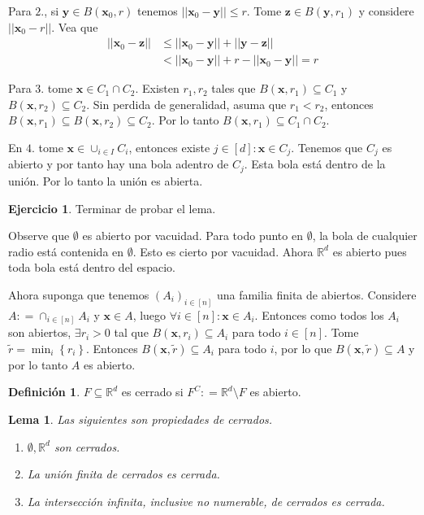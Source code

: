 \documentclass[12pt]{article}
\theoremstyle{plain}
\newtheorem{Lem}[Th]{Lema}             %
\theoremstyle{definition}
\newtheorem{Def}[Th]{Definición}       %
\newtheorem{Ej}[Th]{Ejercicio}
\theoremstyle{remark}
\numberwithin{equation}{section}
\newcommand{\bR}{\mathbb{R}}        %
\renewcommand{\leq}{\leqslant}      %
\renewcommand{\:}{\colon}           %
\renewcommand{\vec}[1]{\mathbf{#1}}
\newcommand{\vx}{\vec{x}}           %
\newcommand{\vy}{\vec{y}}
\newcommand{\vz}{\vec{z}}
\newcommand{\conj}[1]{\left\lbrace#1\right\rbrace}
\newcommand{\bonj}[1]{\left\lbrack#1\right\rbrack}
\begin{document}
\begin{multicols}{2}
\begin{ptcbp}
Para $\mathit{2}.$, si $\vy\in B(\vx_0,r)$ tenemos $||\vx_0-\vy||\leq r$. Tome $\vz\in B(\vy,r_1)$ y considere $||\vx_0-r||$. Vea que
\begin{align*}
  ||\vx_0-\vz|| &\leq ||\vx_0-\vy||+||\vy-\vz|| \\
  &<||\vx_0-\vy||+r-||\vx_0-\vy|| = r
\end{align*}



Para $\mathit{3}.$ tome $\vx\in C_1\cap C_2$. Existen $r_1,r_2$ tales que $B(\vx,r_1)\subseteq C_1$ y $B(\vx,r_2)\subseteq C_2$. Sin perdida de generalidad, asuma que $r_1<r_2$, entonces $B(\vx,r_1)\subseteq B(\vx,r_2)\subseteq C_2$. Por lo tanto $B(\vx,r_1)\subseteq C_1\cap C_2$.\par
En $\mathit{4}.$ tome $\vx\in\cup_{i\in I} C_i$, entonces existe $j\in\bonj{d}: \vx\in C_j$. Tenemos que $C_j$ es abierto y por tanto hay una bola adentro de $C_j$. Esta bola está dentro de la unión. Por lo tanto la unión es abierta.
\end{ptcbp}

\begin{Ej}
  Terminar de probar el lema.
\end{Ej}

\begin{ptcb}
Observe que $\emptyset$ es abierto por vacuidad. Para todo punto en $\emptyset$, la bola de cualquier radio está contenida en $\emptyset$. Esto es cierto por vacuidad. Ahora $\bR^d$ es abierto pues toda bola está dentro del espacio.\par
Ahora suponga que tenemos $(A_i)_{i\in\bonj{n}}$ una familia finita de abiertos. Considere $A\colon=\cap_{i\in\bonj{n}}A_i$ y $\vec{x}\in A$, luego $\forall i\in\bonj{n}: \vx\in A_i$. Entonces como todos los $A_i$ son abiertos, $\exists r_i>0$ tal que $B(\vx,r_i)\subseteq A_i$ para todo $i\in\bonj{n}$. Tome $\tilde{r}=\min_i\conj{r_i}$. Entonces $B(\vx,\tilde{r})\subseteq A_i$ para todo $i$, por lo que $B(\vx,\tilde{r})\subseteq A$ y por lo tanto $A$ es abierto.

\end{ptcb}

\begin{Def}
  $F\subseteq\bR^d$ es cerrado si $F^C\colon= \bR^d\setminus F$ es abierto.
\end{Def}

\begin{Lem}\label{propCerrados} Las siguientes son propiedades de cerrados.
  \begin{enumerate}
    \item $\emptyset, \bR^d$ son cerrados.
    \item La unión finita de cerrados es cerrada.
    \item La intersección infinita, inclusive no numerable, de cerrados es cerrada.
  \end{enumerate}
\end{Lem}


\end{multicols}
\end{document}
